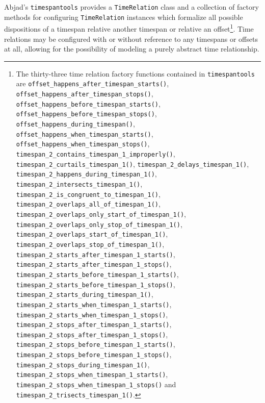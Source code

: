 Abjad's \texttt{timespantools} provides a \texttt{TimeRelation} class and a
collection of factory methods for configuring \texttt{TimeRelation} instances
which formalize all possible dispositions of a timespan relative another
timespan or relative an offset\footnote{ The thirty-three time relation factory
functions contained in \texttt{timespantools} are
\texttt{offset\_happens\_after\_timespan\_starts()},
\texttt{offset\_happens\_after\_timespan\_stops()},
\texttt{offset\_happens\_before\_timespan\_starts()},
\texttt{offset\_happens\_before\_timespan\_stops()},
\texttt{offset\_happens\_during\_timespan()},
\texttt{offset\_happens\_when\_timespan\_starts()},
\texttt{offset\_happens\_when\_timespan\_stops()},
\texttt{timespan\_2\_contains\_timespan\_1\_improperly()},
\texttt{timespan\_2\_curtails\_timespan\_1()},
\texttt{timespan\_2\_delays\_timespan\_1()},
\texttt{timespan\_2\_happens\_during\_timespan\_1()},
\texttt{timespan\_2\_intersects\_timespan\_1()},
\texttt{timespan\_2\_is\_congruent\_to\_timespan\_1()},
\texttt{timespan\_2\_overlaps\_all\_of\_timespan\_1()},
\texttt{timespan\_2\_overlaps\_only\_start\_of\_timespan\_1()},
\texttt{timespan\_2\_overlaps\_only\_stop\_of\_timespan\_1()},
\texttt{timespan\_2\_overlaps\_start\_of\_timespan\_1()},
\texttt{timespan\_2\_overlaps\_stop\_of\_timespan\_1()},
\texttt{timespan\_2\_starts\_after\_timespan\_1\_starts()},
\texttt{timespan\_2\_starts\_after\_timespan\_1\_stops()},
\texttt{timespan\_2\_starts\_before\_timespan\_1\_starts()},
\texttt{timespan\_2\_starts\_before\_timespan\_1\_stops()},
\texttt{timespan\_2\_starts\_during\_timespan\_1()},
\texttt{timespan\_2\_starts\_when\_timespan\_1\_starts()},
\texttt{timespan\_2\_starts\_when\_timespan\_1\_stops()},
\texttt{timespan\_2\_stops\_after\_timespan\_1\_starts()},
\texttt{timespan\_2\_stops\_after\_timespan\_1\_stops()},
\texttt{timespan\_2\_stops\_before\_timespan\_1\_starts()},
\texttt{timespan\_2\_stops\_before\_timespan\_1\_stops()},
\texttt{timespan\_2\_stops\_during\_timespan\_1()},
\texttt{timespan\_2\_stops\_when\_timespan\_1\_starts()},
\texttt{timespan\_2\_stops\_when\_timespan\_1\_stops()} and
\texttt{timespan\_2\_trisects\_timespan\_1()}. }. Time relations may be
configured with or without reference to any timespans or offsets at all,
allowing for the possibility of modeling a purely abstract time relationship.

\begin{comment}
<abjad>
time_relation_1 = timespantools.timespan_2_intersects_timespan_1()
print(format(time_relation_1))
</abjad>
\end{comment}

